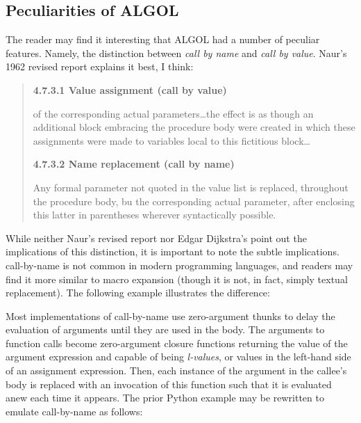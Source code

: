 \subsection{Peculiarities of ALGOL}

The reader may find it interesting that ALGOL had a number of peculiar features.
Namely, the distinction between \textit{call by name} and \textit{call by value}.
Naur's 1962 revised report explains it best, I think\cite[Section 4.7.3]{naur_revised_report_algol_1962}:

\begin{quotation}
	\noindent
	\textbf{4.7.3.1 Value assignment (call by value)}

	of the corresponding actual parameters\dots the effect is as though an
	additional block embracing the procedure body were created in which these
	assignments were made to variables local to this fictitious block\dots

	\noindent
	\textbf{4.7.3.2 Name replacement (call by name)}

	Any formal parameter not quoted in the value list is replaced, throughout the
	procedure body, bu the corresponding actual parameter, after enclosing this
	latter in parentheses wherever syntactically possible.
\end{quotation}

While neither Naur's revised report nor Edgar Dijkstra's
point out the implications of this distinction, it is important to note
the subtle implications.
\Gls{call-by-name} is not common in modern programming languages, and readers
may find it more similar to macro expansion
(though it is not, in fact, simply textual replacement).
The following example illustrates the difference:



Most implementations of call-by-name use zero-argument thunks to delay
the evaluation of arguments until they are used in the body.
The arguments to function calls become zero-argument closure functions
returning the value of the argument expression and capable of being
\textit{\gls{l-value}s}, or values in the left-hand side of an assignment expression.
Then, each instance of the argument in the callee's body is replaced
with an invocation of this function such that it is evaluated anew
each time it appears.
The prior Python example may be rewritten to emulate call-by-name as follows:

